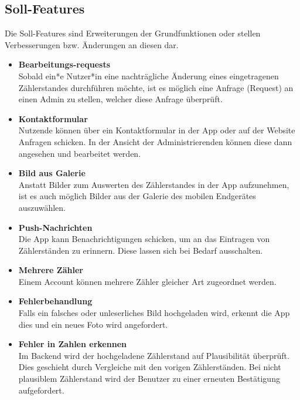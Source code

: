 \subsection{Soll-Features}
Die Soll-Features sind Erweiterungen der Grundfunktionen oder stellen Verbesserungen bzw. Änderungen an diesen dar.
\begin{itemize}
\item \textbf{Bearbeitungs-requests} \hfill \\
Sobald ein*e Nutzer*in eine nachträgliche Änderung eines eingetragenen 
Zählerstandes durchführen möchte, ist es möglich eine Anfrage (Request) an einen Admin zu stellen, welcher diese Anfrage
überprüft.
\item \textbf{Kontaktformular} \hfill \\
	Nutzende können über ein Kontaktformular in der App oder auf der Website Anfragen schicken.
	In der Ansicht der Administrierenden können diese dann angesehen und bearbeitet werden. 
\item \textbf{Bild aus Galerie} \hfill \\
	Anstatt Bilder zum Auswerten des Zählerstandes in der App aufzunehmen, ist es auch möglich Bilder aus der Galerie des mobilen Endgerätes auszuwählen.
\item \textbf{Push-Nachrichten} \hfill \\
	Die App kann Benachrichtigungen schicken, um an das Eintragen von Zählerständen zu erinnern.
	Diese lassen sich bei Bedarf ausschalten.
\item \textbf{Mehrere Zähler}\hfill \\
	Einem Account können mehrere Zähler gleicher Art zugeordnet werden.
\item \textbf{Fehlerbehandlung} \hfill \\
	Falls ein falsches oder unleserliches Bild hochgeladen wird, erkennt die App dies und ein neues Foto wird angefordert.
\item \textbf{Fehler in Zahlen erkennen} \hfill \\
	Im Backend wird der hochgeladene Zählerstand auf Plausibilität überprüft. Dies geschieht durch Vergleiche mit den vorigen Zählerständen. 
	Bei nicht plausiblem Zählerstand wird der Benutzer zu einer erneuten Bestätigung aufgefordert. 
\end{itemize}

